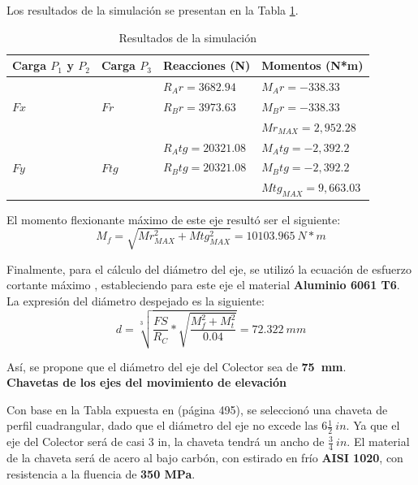 Los resultados de la simulación se presentan en la Tabla \ref{tab:colec1}.

\begin{table}[H]
	\centering
	\caption{Resultados de la simulación}
	\begin{tabular}{|l|l|l|l|}
		\hline
		\textbf{Carga $ P_1 $ y $ P_2 $} & \textbf{Carga $ P_3 $} & \textbf{Reacciones (N)} & \textbf{Momentos (N*m)} \\
		\hline \hline
		\multirow{3}[6]{*}{$ Fx $} & \multirow{3}[6]{*}{$ Fr $} & $ R_Ar=3682.94 $ & $ M_Ar=-338.33 $ \\
		\cline{3-4}          &       & $ R_Br=3973.63 $ & $ M_Br=-338.33 $ \\
		\cline{3-4}          &       &  & $ Mr_{MAX}=2,952.28 $ \\
		\hline
		\multirow{3}[6]{*}{$ Fy $} & \multirow{3}[6]{*}{$ Ftg $} & $ R_Atg=20321.08 $ & $ M_Atg=-2,392.2 $ \\
		\cline{3-4}          &       & $ R_Btg=20321.08 $ & $ M_Btg=-2,392.2 $ \\
		\cline{3-4}          &       &       & $ Mtg_{MAX}=9,663.03 $ \\
		\hline
	\end{tabular}%
	\label{tab:colec1}%
\end{table}%

El momento flexionante máximo de este eje resultó ser el siguiente:
\begin{equation}
M_f = \sqrt{Mr_{MAX}^2 + Mtg_{MAX}^2} = 10103.965\ N*m
\end{equation}

Finalmente, para el cálculo del diámetro del eje, se utilizó la ecuación de esfuerzo cortante máximo \cite{DDA10}, estableciendo para este eje el material \textbf{Aluminio 6061 T6}. La expresión del diámetro despejado es la siguiente:
\begin{equation}
d=\sqrt[3]{\frac{FS}{R_C}*\sqrt{\frac{M_f^2+M_t^2}{0.04}}}=72.322\ mm
\end{equation}

Así, se propone que el diámetro del eje del Colector sea de \textbf{75\ mm}.\\

\textbf{Chavetas de los ejes del movimiento de elevación}

Con base en la Tabla expuesta en \cite{DDA3} (página 495), se seleccionó una chaveta de perfil cuadrangular, dado que el diámetro del eje no excede las $ 6 \frac{1}{2}\ in $. Ya que el eje del Colector será de casi 3 in, la chaveta tendrá un ancho de $ \frac{3}{4}\ in $. El material de la chaveta será de acero al bajo carbón, con estirado en frío \textbf{AISI 1020}, con resistencia a la fluencia de \textbf{350 MPa}.

